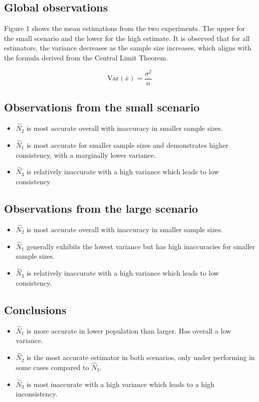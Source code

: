 \documentclass{report}
\begin{document}
\subsection{Global observations}
Figure 1 shows the mean estimations from the two experiments. The upper for the small scenario and the lower for the high estimate. 
It is observed that for all estimators, the variance decreases as the sample size increases, which aligns with the formula derived from the Central Limit Theorem. 

\begin{equation}\mathrm{Var}(\bar{x}) = \frac{\sigma^2}{n}\end{equation}

\subsection{Observations from the small scenario}

\begin{itemize}
    \item $\hat{N}_2$ is most accurate overall with inaccuracy in smaller sample sizes. 
    \item $\hat{N}_1$ is most accurate for smaller sample sizes and demonstrates higher consistency, with a marginally lower variance.
    \item $\hat{N}_3$ is relatively inaccurate with a high variance which leads to low consistency 
\end{itemize}

\subsection{Observations from the large scenario}

\begin{itemize}
    \item $\hat{N}_2$ is most accurate overall with inaccuracy in smaller sample sizes. 
    \item $\hat{N}_1$ generally exhibits the lowest variance but has high inaccuracies for smaller sample sizes.
    \item $\hat{N}_3$ is relatively inaccurate with a high variance which leads to low consistency. 
\end{itemize}

\subsection{Conclusions}

\begin{itemize}
    \item $\hat{N}_1$ is more accurate in lower population than larger. Has overall a low variance. 
    \item $\hat{N}_2$ is the most accurate estimator in both scenarios, only under performing in some cases compared to $\hat{N}_1$. 
    \item $\hat{N}_3$ is most inaccurate with a high variance which leads to a high inconsistency.
\end{itemize}
\end{document}
